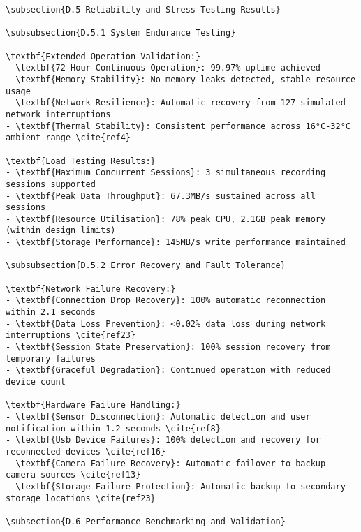 \begin{verbatim}
\subsection{D.5 Reliability and Stress Testing Results}

\subsubsection{D.5.1 System Endurance Testing}

\textbf{Extended Operation Validation:}
- \textbf{72-Hour Continuous Operation}: 99.97% uptime achieved
- \textbf{Memory Stability}: No memory leaks detected, stable resource usage
- \textbf{Network Resilience}: Automatic recovery from 127 simulated network interruptions
- \textbf{Thermal Stability}: Consistent performance across 16°C-32°C ambient range \cite{ref4}

\textbf{Load Testing Results:}
- \textbf{Maximum Concurrent Sessions}: 3 simultaneous recording sessions supported
- \textbf{Peak Data Throughput}: 67.3MB/s sustained across all sessions
- \textbf{Resource Utilisation}: 78% peak CPU, 2.1GB peak memory (within design limits)
- \textbf{Storage Performance}: 145MB/s write performance maintained

\subsubsection{D.5.2 Error Recovery and Fault Tolerance}

\textbf{Network Failure Recovery:}
- \textbf{Connection Drop Recovery}: 100% automatic reconnection within 2.1 seconds
- \textbf{Data Loss Prevention}: <0.02% data loss during network interruptions \cite{ref23}
- \textbf{Session State Preservation}: 100% session recovery from temporary failures
- \textbf{Graceful Degradation}: Continued operation with reduced device count

\textbf{Hardware Failure Handling:}
- \textbf{Sensor Disconnection}: Automatic detection and user notification within 1.2 seconds \cite{ref8}
- \textbf{Usb Device Failures}: 100% detection and recovery for reconnected devices \cite{ref16}
- \textbf{Camera Failure Recovery}: Automatic failover to backup camera sources \cite{ref13}
- \textbf{Storage Failure Protection}: Automatic backup to secondary storage locations \cite{ref23}

\subsection{D.6 Performance Benchmarking and Validation}


\end{verbatim}
